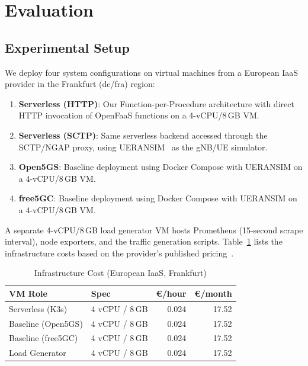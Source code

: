 \section{Evaluation}
\label{sec:evaluation}

\subsection{Experimental Setup}

We deploy four system configurations on virtual machines from a European IaaS provider in the Frankfurt (de/fra) region:

\begin{enumerate}
    \item \textbf{Serverless (HTTP)}: Our Function-per-Procedure architecture with direct HTTP invocation of OpenFaaS functions on a 4-vCPU/8\,GB VM.
    \item \textbf{Serverless (SCTP)}: Same serverless backend accessed through the SCTP/NGAP proxy, using UERANSIM~\cite{ueransim} as the gNB/UE simulator.
    \item \textbf{Open5GS}: Baseline deployment using Docker Compose with UERANSIM on a 4-vCPU/8\,GB VM.
    \item \textbf{free5GC}: Baseline deployment using Docker Compose with UERANSIM on a 4-vCPU/8\,GB VM.
\end{enumerate}

A separate 4-vCPU/8\,GB load generator VM hosts Prometheus (15-second scrape interval), node exporters, and the traffic generation scripts. Table~\ref{tab:infra-cost} lists the infrastructure costs based on the provider's published pricing~\cite{cloud-pricing}.

\begin{table}[t]
\centering
\caption{Infrastructure Cost (European IaaS, Frankfurt)}
\label{tab:infra-cost}
\small
\begin{tabular}{@{}llrr@{}}
\toprule
\textbf{VM Role} & \textbf{Spec} & \textbf{\euro/hour} & \textbf{\euro/month} \\
\midrule
Serverless (K3s) & 4 vCPU / 8\,GB & 0.024 & 17.52 \\
Baseline (Open5GS) & 4 vCPU / 8\,GB & 0.024 & 17.52 \\
Baseline (free5GC) & 4 vCPU / 8\,GB & 0.024 & 17.52 \\
Load Generator & 4 vCPU / 8\,GB & 0.024 & 17.52 \\
\bottomrule
\end{tabular}
\end{table}

